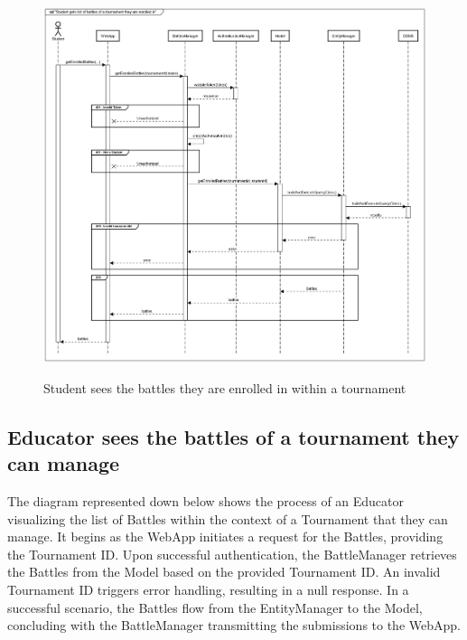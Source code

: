 \documentclass{Configuration_Files/Template}
\begin{document}
\begin{figure}[H]
\centering
\includegraphics[scale = 0.33]{Images/diagrams/sequences/GetEnrolledBattles.png}\\
\caption{Student sees the battles they are enrolled in within a tournament}
\end{figure}

\subsection{Educator sees the battles of a tournament they can manage}

The diagram represented down below shows the process of an Educator visualizing the list of Battles within the context of a Tournament that they can manage. It begins as the WebApp initiates a request for the Battles, providing the Tournament ID. Upon successful authentication, the BattleManager retrieves the Battles from the Model based on the provided Tournament ID. An invalid Tournament ID triggers error handling, resulting in a null response. In a successful scenario, the Battles flow from the EntityManager to the Model, concluding with the BattleManager transmitting the submissions to the WebApp.
\end{document}
